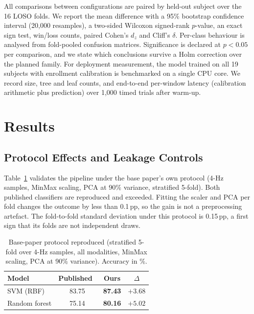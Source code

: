 \documentclass[journal]{IEEEtran}
\newcommand{\pp}{\,pp}
\begin{document}
All comparisons between configurations are paired by held-out subject over the
16 LOSO folds. We report the mean difference with a 95\% bootstrap confidence
interval (20{,}000 resamples), a two-sided Wilcoxon signed-rank $p$-value, an
exact sign test, win/loss counts, paired Cohen's $d_z$ and Cliff's $\delta$.
Per-class behaviour is analysed from fold-pooled confusion matrices.
Significance is declared at $p<0.05$ per comparison, and we state which
conclusions survive a Holm correction over the planned family. For deployment
measurement, the model trained on all 19 subjects with enrollment calibration
is benchmarked on a single CPU core. We record size, tree and leaf counts, and
end-to-end per-window latency (calibration arithmetic plus prediction) over
1{,}000 timed trials after warm-up.

\section{Results}
\subsection{Protocol Effects and Leakage Controls}
\label{sec:protocol}
Table~\ref{tab:repro} validates the pipeline under the base paper's own
protocol (4-Hz samples, MinMax scaling, PCA at 90\% variance, stratified
5-fold). Both published classifiers are reproduced and exceeded. Fitting the
scaler and PCA per fold changes the outcome by less than 0.1\pp, so the gain
is not a preprocessing artefact. The fold-to-fold standard deviation under
this protocol is 0.15\pp, a first sign that its folds are not independent
draws.

\begin{table}[!t]
\caption{Base-paper protocol reproduced (stratified 5-fold over 4-Hz samples,
all modalities, MinMax scaling, PCA at 90\% variance). Accuracy in \%.}
\label{tab:repro}
\centering\footnotesize
\begin{tabular}{@{}lccc@{}}
\toprule
Model & Published~\cite{bodaghi2026uldd} & Ours & $\Delta$ \\
\midrule
SVM (RBF)      & 83.75 & \textbf{87.43} & $+3.68$ \\
Random forest  & 75.14 & \textbf{80.16} & $+5.02$ \\
\bottomrule
\end{tabular}
\end{table}
\end{document}
